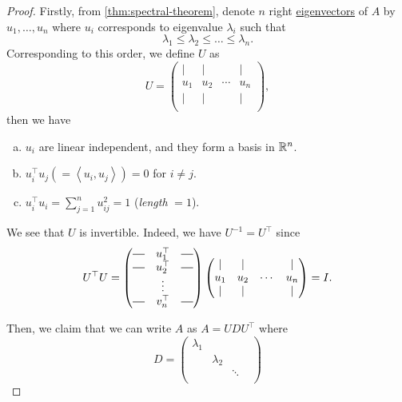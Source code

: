 \begin{proof}
	Firstly, from \autoref{thm:spectral-theorem}, denote \(n\) right \hyperref[def:eigenvector]{eigenvectors} of \(A\) by \(u_1, \ldots , u_n\) where \(u_{i} \)
	corresponds to eigenvalue \(\lambda _i\) such that
	\[
		\lambda _1 \leq \lambda _2 \leq \ldots  \leq \lambda _n.
	\]
	Corresponding to this order, we define \(U\) as
	\[
		U = \begin{pmatrix}
			\mid & \mid &        & \mid \\
			u_1  & u_2  & \cdots & u_n  \\
			\mid & \mid &        & \mid \\
		\end{pmatrix},
	\]
	then we have
	\begin{enumerate}[(a)]
		\item \(u_i\) are linear independent, and they form a basis in \(\mathbb{\MakeUppercase{r}} ^n\).
		\item \(u_{i} ^{\top} u_{j} ( = \left< u_{i} , u_{j}  \right> ) = 0\) for \(i\neq j\).
		\item \(u_{i} ^{\top} u_{i} = \sum_{j=1}^{n} u_{ij}^{2} = 1 \) (\emph{length} \(= 1\)).
	\end{enumerate}
	\begin{remark}[\(U\) is invertible]
		We see that \(U\) is invertible. Indeed, we have \(U^{-1} = U^{\top} \) since
		\[
			U^{\top}U = \begin{pmatrix}
				\horzbar & u^{\top}_1 & \horzbar \\
				\horzbar & u^{\top}_2 & \horzbar \\
				         & \vdots     &          \\
				\horzbar & v^{\top}_n & \horzbar \\
			\end{pmatrix}\begin{pmatrix}
				\mid & \mid &        & \mid \\
				u_1  & u_2  & \cdots & u_n  \\
				\mid & \mid &        & \mid \\
			\end{pmatrix} = I.
		\]
	\end{remark}
	Then, we claim that we can write \(A\) as \(A = U D U^{\top}\) where \[
		D  = \begin{pmatrix}
			\lambda_1 &           &        &           \\
			          & \lambda_2 &        &           \\
			          &           & \ddots &           \\

\end{pmatrix}\]
\end{proof}
